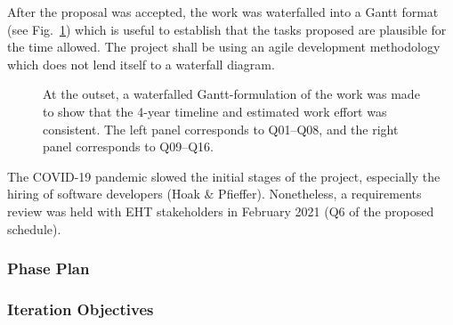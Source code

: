 After the proposal was accepted, the work was waterfalled into a Gantt format (see Fig.~\ref{fig:ganttcrap}) which is useful to establish that the tasks proposed are plausible for the time allowed.  The project shall be using an agile development methodology which does not lend itself to a waterfall diagram.
\begin{figure}[!h]
  \captionsetup{width=0.7\linewidth}
\caption[Initial Gantt Timeline]{%
At the outset, a waterfalled Gantt-formulation of the work was
made to show that the 4-year timeline and estimated work effort
was consistent. The left panel corresponds to Q01--Q08, and the
right panel corresponds to Q09--Q16.}
\label{fig:ganttcrap}
\end{figure}

The COVID-19 pandemic slowed the initial stages of the project, especially the hiring of software developers (Hoak \& Pfieffer).  Nonetheless, a requirements review was held with EHT stakeholders in February 2021 (Q6 of the proposed schedule).

\subsubsection{Phase Plan}


\subsubsection{Iteration Objectives}



